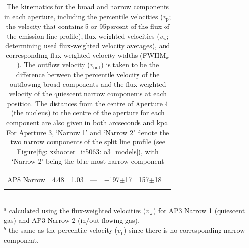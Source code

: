 \begin{table}
\begin{tabular}{lcccccc}
		&	&	&	&	&	&	\\
	AP8 Narrow       & 4.48              & 1.03           & ---  & $-$197$\pm$17 & 157$\pm$18 &                  \\
		&	&	&	&	&	&	\\
	\end{tabular} \\
	$^a$ calculated using the flux-weighted velocities ($v_\mathrm{w}$) for AP3 Narrow 1 (quiescent gas) and AP3 Narrow 2 (in/out-flowing gas). \\
	$^b$ the same as the percentile velocity ($v_\mathrm{p}$) since there is no corresponding narrow component.\\
	\caption[Warm-ionised gas kinematics along the radio structure of IC.]{The kinematics for the broad and narrow components in each aperture, including the percentile velocities ($v_\mathrm{p}$; the velocity that contains 5 or 95\;per\;cent of the flux of the emission-line profile), flux-weighted velocities ($v_\mathrm{w}$; determining used flux-weighted velocity averages), and corresponding flux-weighted velocity widths (FWHM$_\mathrm{w}$). The outflow velocity ($v_\mathrm{out}$) is taken to be the difference between the percentile velocity of the outflowing broad components and the flux-weighted velocity of the quiescent narrow components at each position. The distances from the centre of Aperture 4 (the nucleus) to the centre of the aperture for each component are also given in both arcseconds and kpc. For Aperture 3, `Narrow 1' and `Narrow 2' denote the two narrow components of the split line profile (see Figure\;\ref{fig: xshooter_ic5063: o3_models}), with `Narrow 2' being the blue-most narrow component}
	\label{tab: xshooter_ic5063: kinematics}
\end{table}

